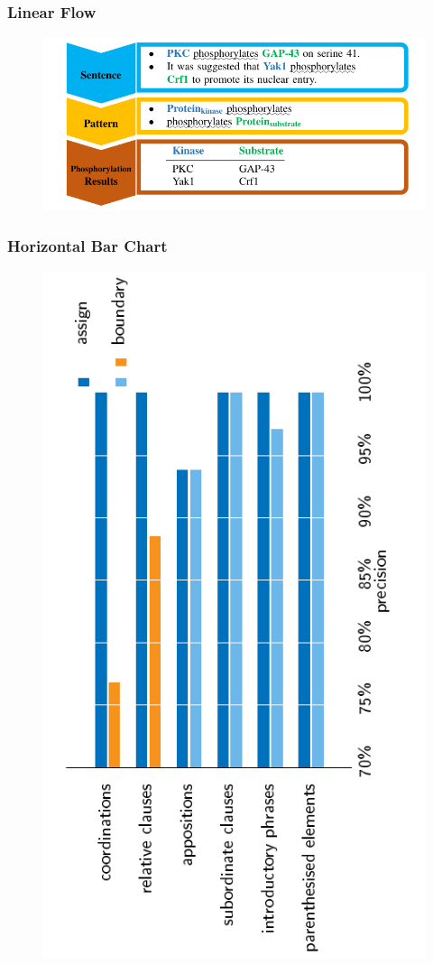 \documentclass{beamer}
\begin{document}
\begin{frame}
  \frametitle{Linear Flow}
  \begin{figure}
    \includegraphics[width=\textwidth,page=2]{linear.pdf}
  \end{figure}
\end{frame}

\begin{frame}[label=bar,fragile]
	\frametitle{Horizontal Bar Chart}
	\begin{figure}
	  \vspace*{-2em}
	  \includegraphics[height=\textwidth,angle=-90]{fvaluemodify.pdf}
	\end{figure}
\end{frame}
\end{document}
